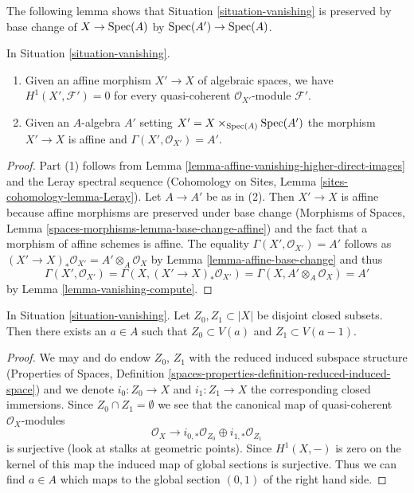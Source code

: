 \noindent
The following lemma shows that Situation \ref{situation-vanishing}
is preserved by base change of $X \to \mathop{\mathrm{Spec}}(A)$ by $\mathop{\mathrm{Spec}}(A') \to \mathop{\mathrm{Spec}}(A)$.

\begin{lemma}
\label{lemma-vanishing-base-change}
In Situation \ref{situation-vanishing}.
\begin{enumerate}
\item Given an affine morphism $X' \to X$ of algebraic spaces, we have
$H^1(X', \mathcal{F}') = 0$ for every quasi-coherent
$\mathcal{O}_{X'}$-module $\mathcal{F}'$.
\item Given an $A$-algebra $A'$ setting $X' = X \times_{\mathop{\mathrm{Spec}}(A)} \mathop{\mathrm{Spec}}(A')$
the morphism $X' \to X$ is affine and $\Gamma(X', \mathcal{O}_{X'}) = A'$.
\end{enumerate}
\end{lemma}

\begin{proof}
Part (1) follows from Lemma \ref{lemma-affine-vanishing-higher-direct-images}
and the Leray spectral sequence (Cohomology on Sites, Lemma
\ref{sites-cohomology-lemma-Leray}). Let $A \to A'$ be as in (2).
Then $X' \to X$ is affine because affine morphisms are preserved under
base change (Morphisms of Spaces, Lemma
\ref{spaces-morphisms-lemma-base-change-affine}) and the
fact that a morphism of affine schemes is affine. The equality
$\Gamma(X', \mathcal{O}_{X'}) = A'$ follows as
$(X' \to X)_*\mathcal{O}_{X'} = A' \otimes_A \mathcal{O}_X$
by Lemma \ref{lemma-affine-base-change} and thus
$$
\Gamma(X', \mathcal{O}_{X'}) =
\Gamma(X, (X' \to X)_*\mathcal{O}_{X'}) =
\Gamma(X, A' \otimes_A \mathcal{O}_X) = A'
$$
by Lemma \ref{lemma-vanishing-compute}.
\end{proof}

\begin{lemma}
\label{lemma-vanishing-separate-closed}
In Situation \ref{situation-vanishing}. Let $Z_0, Z_1 \subset |X|$
be disjoint closed subsets. Then there exists an $a \in A$ such that
$Z_0 \subset V(a)$ and $Z_1 \subset V(a - 1)$.
\end{lemma}

\begin{proof}
We may and do endow $Z_0$, $Z_1$ with the reduced induced subspace structure
(Properties of Spaces, Definition
\ref{spaces-properties-definition-reduced-induced-space}) and we denote
$i_0 : Z_0 \to X$ and $i_1 : Z_1 \to X$ the corresponding closed immersions.
Since $Z_0 \cap Z_1 = \emptyset$ we see that the canonical map of
quasi-coherent $\mathcal{O}_X$-modules
$$
\mathcal{O}_X
\longrightarrow
i_{0, *}\mathcal{O}_{Z_0} \oplus i_{1, *}\mathcal{O}_{Z_1}
$$
is surjective (look at stalks at geometric points). Since $H^1(X, -)$ is
zero on the kernel of this map the induced map of global sections is
surjective. Thus we can find $a \in A$ which maps to the global section
$(0, 1)$ of the right hand side.
\end{proof}

